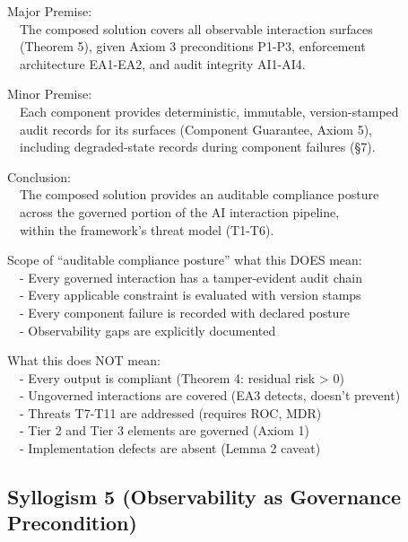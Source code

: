 \begin{claddisp}
Major Premise:\\
~~The composed solution covers all observable interaction surfaces\\
~~(Theorem 5), given Axiom 3 preconditions P1-P3, enforcement\\
~~architecture EA1-EA2, and audit integrity AI1-AI4.
\par\smallskip
Minor Premise:\\
~~Each component provides deterministic, immutable, version-stamped\\
~~audit records for its surfaces (Component Guarantee, Axiom 5),\\
~~including degraded-state records during component failures (\S{}7).
\par\smallskip
Conclusion:\\
~~The composed solution provides an auditable compliance posture\\
~~across the governed portion of the AI interaction pipeline,\\
~~within the framework's threat model (T1-T6).
\par\smallskip
Scope of ``auditable compliance posture'' \textemdash{} what this DOES mean:\\
~~- Every governed interaction has a tamper-evident audit chain\\
~~- Every applicable constraint is evaluated with version stamps\\
~~- Every component failure is recorded with declared posture\\
~~- Observability gaps are explicitly documented
\par\smallskip
What this does NOT mean:\\
~~- Every output is compliant (Theorem 4: residual risk > 0)\\
~~- Ungoverned interactions are covered (EA3 detects, doesn't prevent)\\
~~- Threats T7-T11 are addressed (requires ROC, MDR)\\
~~- Tier 2 and Tier 3 elements are governed (Axiom 1)\\
~~- Implementation defects are absent (Lemma 2 caveat)
\end{claddisp}


\subsection{Syllogism 5 (Observability as Governance Precondition)}


